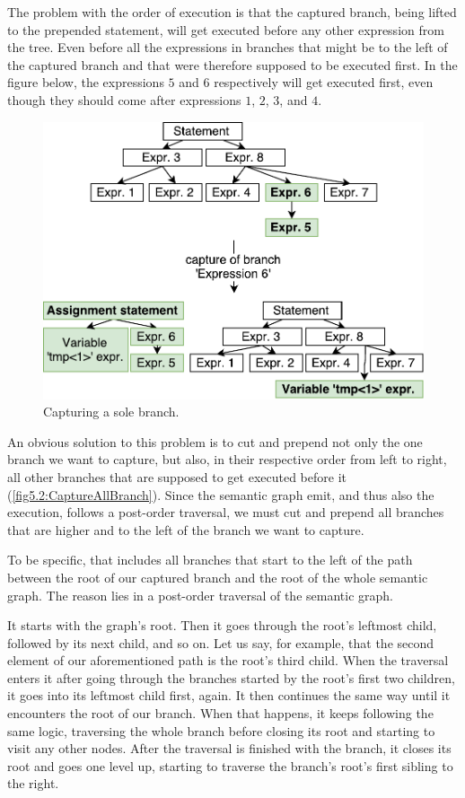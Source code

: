 The problem with the order of execution is that the captured branch, being lifted to the prepended statement, will get executed before any other expression from the tree. Even before all the expressions in branches that might be to the left of the captured branch and that were therefore supposed to be executed first. In the figure below, the expressions $5$ and $6$ respectively will get executed first, even though they should come after expressions $1$, $2$, $3$, and $4$.


\begin{figure}[h]
	\centering	
	\includegraphics[scale=0.75]{../img/5_2_capturing}	
	\caption{Capturing a sole branch.}
	\label{fig5.2:CaptureBranch}
\end{figure}

An obvious solution to this problem is to cut and prepend not only the one branch we want to capture, but also, in their respective order from left to right, all other branches that are supposed to get executed before it (\autoref{fig5.2:CaptureAllBranch}). Since the semantic graph emit, and thus also the execution, follows a post-order traversal, we must cut and prepend all branches that are higher and to the left of the branch we want to capture. 

To be specific, that includes all branches that start to the left of the path between the root of our captured branch and the root of the whole semantic graph. The reason lies in a post-order traversal of the semantic graph. 

It starts with the graph’s root. Then it goes through the root’s leftmost child, followed by its next child, and so on. Let us say, for example, that the second element of our aforementioned path is the root’s third child. When the traversal enters it after going through the branches started by the root’s first two children, it goes into its leftmost child first, again. It then continues the same way until it encounters the root of our branch. When that happens, it keeps following the same logic, traversing the whole branch before closing its root and starting to visit any other nodes. After the traversal is finished with the branch, it closes its root and goes one level up, starting to traverse the branch’s root’s first sibling to the right.   

